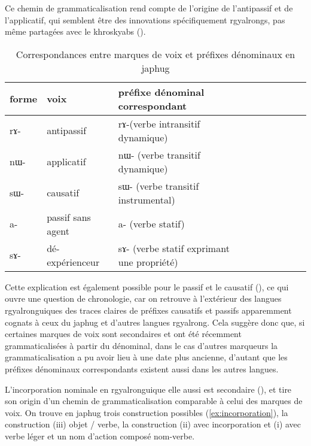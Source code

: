 \documentclass[oldfontcommands,oneside,a4paper,11pt]{article}
\newcommand{\ipa}[1]{{\phon \mbox{#1}}} %
\begin{document}
Ce chemin de grammaticalisation rend compte de l'origine de l'antipassif et de l'applicatif, qui semblent être des innovations spécifiquement rgyalrongs, pas même partagées avec le khroskyabs  (\citealt{jacques14antipassive}).


 
 
\begin{table}[h]
\caption{Correspondances entre marques de voix et préfixes dénominaux en japhug} \centering \label{tab:denominal}
\begin{tabular}{lllllllll} \toprule
forme & voix & préfixe dénominal correspondant \\
\midrule
\ipa{rɤ}- & antipassif &    \ipa{rɤ}-(verbe intransitif dynamique) \\
\ipa{nɯ}- & applicatif &    \ipa{nɯ}- (verbe transitif dynamique) \\
\ipa{sɯ}- & causatif &    \ipa{sɯ}- (verbe transitif instrumental)\\
\ipa{a}- & passif sans agent &    \ipa{a}- (verbe statif) \\
\ipa{sɤ}-  & dé-expérienceur &    \ipa{sɤ}- (verbe statif exprimant une propriété)\\
    \bottomrule
\end{tabular}
\end{table}


Cette explication est également possible pour le passif et le causatif   (\citealt{jacques15causative}), ce qui ouvre une question de chronologie, car on retrouve à l'extérieur des langues rgyalronguiques des traces claires de préfixes causatifs et passifs apparemment cognats à ceux du japhug et d'autres langues rgyalrong. Cela suggère donc que, si certaines marques de voix sont secondaires et ont été récemment grammaticalisées à partir du dénominal, dans le cas d'autres marqueurs la grammaticalisation a pu avoir lieu à une date plus ancienne, d'autant que les préfixes dénominaux correspondants existent aussi dans les autres langues.

L'incorporation nominale en rgyalronguique elle aussi est secondaire  (\citealt{jacques12incorp, lai13affixale}), et tire son origin d'un chemin de grammaticalisation comparable à celui des marques de voix. On trouve en japhug trois construction possibles (\ref{ex:incorporation}), la construction (iii) objet / verbe, la construction (ii) avec incorporation et (i) avec verbe léger et un nom d'action composé nom-verbe.
\end{document}
